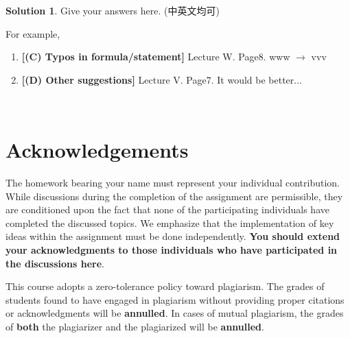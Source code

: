 \documentclass[a4paper]{article}
\numberwithin{equation}{section}
\theoremstyle{definition}
\newtheorem*{solution}{Solution}
\theoremstyle{definition}
\begin{document}
\begin{solution}
  Give your answers here. (中英文均可)

For example, 
\begin{enumerate}
    \item[(1)] \textbf{[(C) Typos in formula/statement]} Lecture W. Page8. www $\rightarrow$ vvv
    \item[(2)] \textbf{[(D) Other suggestions]} Lecture V. Page7. It would be better...
\end{enumerate}
~\\
\end{solution}

\newpage
\section*{Acknowledgements}
The homework bearing your name must represent your individual contribution. While discussions during the completion of the assignment are permissible, they are conditioned upon the fact that none of the participating individuals have completed the discussed topics. We emphasize that the implementation of key ideas within the assignment must be done independently. \textbf{\color{red}You should extend your acknowledgments to those individuals who have participated in the discussions here}.

This course adopts a zero-tolerance policy toward plagiarism. The grades of students found to have engaged in plagiarism without providing proper citations or acknowledgments will be \textbf{{\color{red}annulled}}. In cases of mutual plagiarism, the grades of \textbf{{\color{red}both}} the plagiarizer and the plagiarized will be \textbf{{\color{red}annulled}}. 
\end{document}
